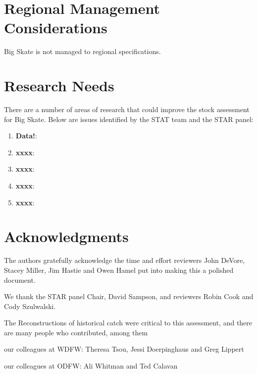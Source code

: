 \documentclass[12pt,]{article}
\begin{document}
\newpage

\hypertarget{regional-management-considerations}{%
\section{Regional Management
Considerations}\label{regional-management-considerations}}

Big Skate is not managed to regional specifications. \newpage

\hypertarget{research-needs}{%
\section{Research Needs}\label{research-needs}}

There are a number of areas of research that could improve the stock
assessment for Big Skate. Below are issues identified by the STAT team
and the STAR panel:

\begin{enumerate}

\item \textbf{Data!}: 

\item \textbf{xxxx}:

\item \textbf{xxxx}:

\item \textbf{xxxx}:

\item \textbf{xxxx}:

\end{enumerate}

\hypertarget{acknowledgments}{%
\section{Acknowledgments}\label{acknowledgments}}

The authors gratefully acknowledge the time and effort reviewers John
DeVore, Stacey Miller, Jim Hastie and Owen Hamel put into making this a
polished document.

We thank the STAR panel Chair, David Sampson, and reviewers Robin Cook
and Cody Szulwalski.

The Reconstructions of historical catch were critical to this
assessment, and there are many people who contributed, among them

our colleagues at WDFW: Theresa Tsou, Jessi Doerpinghaus and Greg
Lippert

our colleagues at ODFW: Ali Whitman and Ted Calavan
\end{document}
